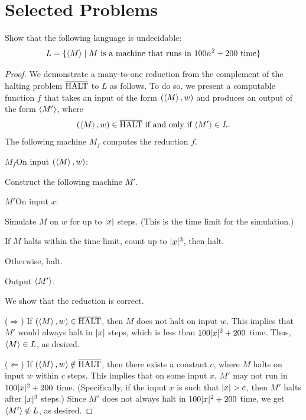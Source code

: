   \section{Selected Problems}
  \begin{problem}
    Show that the following language is undecidable:
    \[ L = \{ \left< M \right> \mid \text{$M$ is a machine that runs in $100 n^2 + 200$ time} \} \]

    \begin{sol}
      \begin{proof}
        We demonstrate a many-to-one reduction from the complement of the halting problem $\overline{\text{HALT}}$ to $L$ as follows. To do so, we present a computable function $f$ that takes an input of the form $(\left< M \right>, w)$ and produces an output of the form $\left< M' \right>$, where
        \[ \text{$(\left< M \right>, w) \in \overline{\text{HALT}}$ if and only if $\left< M' \right> \in L$.} \]
        The following machine $M_f$ computes the reduction $f$.
        \begin{turing}{$M_f$}{On input $(\left< M \right>, w)$:}
        \item Construct the following machine $M'$.
          \begin{turing}{$M'$}{On input $x$:}
          \item Simulate $M$ on $w$ for up to $| x |$ steps. (This is the time limit for the simulation.)
          \item If $M$ halts within the time limit, count up to $| x |^3$, then halt.
          \item Otherwise, halt.
          \end{turing}
        \item Output $\left< M' \right>$.
        \end{turing}

        We show that the reduction is correct.

        ($\Rightarrow$) If $(\left< M \right>, w) \in \overline{\text{HALT}}$, then $M$ does not halt on input $w$. This implies that $M'$ would always halt in $| x |$ steps, which is less than $100 | x |^2 + 200$ time. Thus, $\left< M \right> \in L$, as desired.

        ($\Leftarrow$) If $(\left< M \right>, w) \notin \overline{\text{HALT}}$, then there exists a constant $c$, where $M$ halts on input $w$ within $c$ steps. This implies that on some input $x$, $M'$ may not run in $100 | x |^2 + 200$ time. (Specifically, if the input $x$ is such that $| x | > c$, then $M'$ halts after $| x |^3$ steps.) Since $M'$ does not always halt in $100 | x |^2 + 200$ time, we get $\left< M' \right> \notin L$, as desired.


\end{proof}
\end{sol}
\end{problem}
